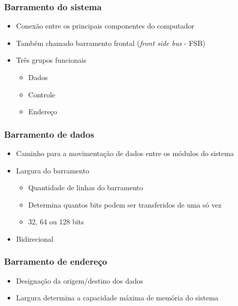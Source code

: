 \documentclass[aspectratio=169,
				xcolor=table]{beamer}
\begin{document}
	\begin{frame}
		\frametitle{Barramento do sistema}
		\begin{itemize}
			\item Conexão entre os principais componentes do computador
			\vspace{1em}
			\item Também chamado barramento frontal (\textit{front side bus} - FSB)
			\vspace{1em}
			\item Três grupos funcionais
			\begin{itemize}
				\item Dados
				\item Controle
				\item Endereço
			\end{itemize}		
		\end{itemize}

	\end{frame}
	
	\begin{frame}
		\frametitle{Barramento de dados}
		\begin{itemize}
			\item Caminho para a movimentação de dados entre os módulos do sistema
			\vspace{1em}
			\item Largura do barramento
			\begin{itemize}
				\item Quantidade de linhas do barramento
				\item Determina quantos bits podem ser transferidos de uma só vez
				\item 32, 64 ou 128 bits 
			\end{itemize}
			\vspace{1em}
			\item Bidirecional
		\end{itemize}
	\end{frame}
	
	\begin{frame}
		\frametitle{Barramento de endereço}
		\begin{itemize}
			\item Designação da origem/destino dos dados
			\vspace{1em}
			\item Largura determina a capacidade máxima de memória do sistema
			\vspace{1em}
			
		\end{itemize}
	\end{frame}
	
\end{document}
